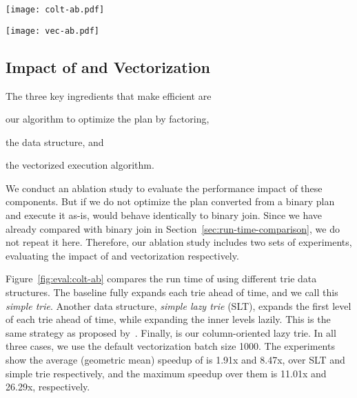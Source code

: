 \begin{figure*}
  \centering
  \begin{minipage}{.45\textwidth}
    \centering
    \texttt{[image: colt-ab.pdf]}
    \label{fig:eval:colt-ab}
  \end{minipage}%
  \hspace{1em}
  \begin{minipage}{.45\textwidth}
    \centering
    \texttt{[image: vec-ab.pdf]}
    \label{fig:eval:vec-ab}
  \end{minipage}
  \end{figure*}
  \subsection{Impact of \COLT and Vectorization}
The three key ingredients that make \FJ efficient 
  are \begin{enumerate*}
    \item our algorithm to optimize the \FJ plan by factoring,
    \item the \COLT data structure, and
    \item the vectorized execution algorithm.
  \end{enumerate*}
We conduct an ablation study to evaluate the performance impact of these components. 
But if we do not optimize the \FJ plan converted from a binary plan 
  and execute it as-is, \FJ would behave identically to binary join.
Since we have already compared \FJ with binary join in Section~\ref{sec:run-time-comparison},
  we do not repeat it here.
Therefore, our ablation study includes two sets of experiments, 
  evaluating the impact of \COLT and vectorization respectively.



Figure~\ref{fig:eval:colt-ab} compares the run time of \FJ using different trie data structures.
The baseline fully expands each trie ahead of time, and we call this \emph{simple trie}.
Another data structure, \emph{simple lazy trie} (SLT), expands the first level of each trie 
  ahead of time, while expanding the inner levels lazily.
This is the same strategy as proposed by~\cite{DBLP:journals/pvldb/FreitagBSKN20}.
Finally, \COLT is our column-oriented lazy trie.
In all three cases, we use the default vectorization batch size 1000.
The experiments show the average (geometric mean) speedup of \COLT 
  is 1.91x and 8.47x, over SLT and simple trie respectively,
  and the maximum speedup over them is 11.01x and 26.29x, respectively.


